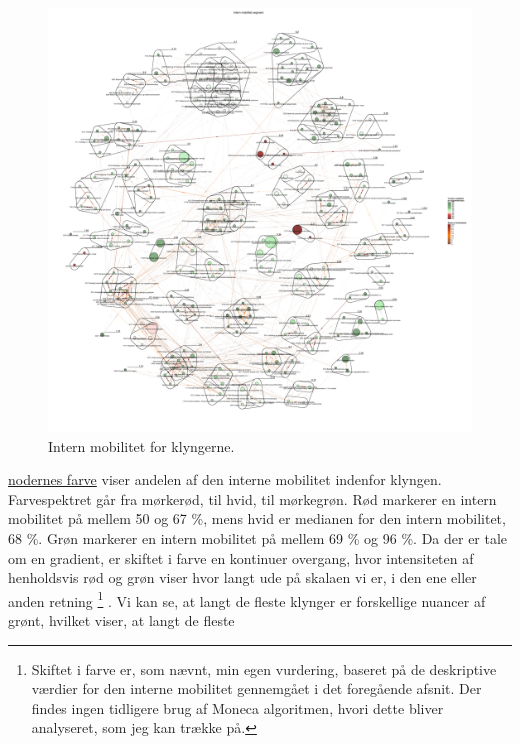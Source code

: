 %
\begin{figure}[H]
\begin{center}
	\caption{Intern mobilitet for klyngerne.}
	\label{fig_analyse_deskriptivt_kort_intern_mob_seg}
	\includegraphics[width=1.0\textwidth]{fig/netvaerkskort/kort_intern_mob_seg.pdf}
\end{center}
\end{figure}
\restoregeometry
%

\underline{nodernes farve} viser andelen af den interne mobilitet indenfor klyngen. Farvespektret går fra mørkerød, til hvid, til mørkegrøn. Rød markerer en intern mobilitet på mellem 50 og 67 \%, mens hvid er medianen for den intern mobilitet, 68 \%. Grøn markerer en intern mobilitet på mellem 69 \% og 96 \%.  Da der er tale om en gradient, er skiftet i farve en kontinuer overgang, hvor intensiteten af henholdsvis rød og grøn viser hvor langt ude på skalaen vi er, i den ene eller anden retning
%
\footnote{ Skiftet i farve er, som nævnt, min egen vurdering, baseret på de deskriptive værdier for den interne mobilitet gennemgået i det foregående afsnit. Der findes ingen tidligere brug af Moneca algoritmen, hvori dette bliver analyseret, som jeg kan trække på.}%
%
. Vi kan se, at langt de fleste klynger er forskellige nuancer af grønt, hvilket viser, at langt de fleste 




